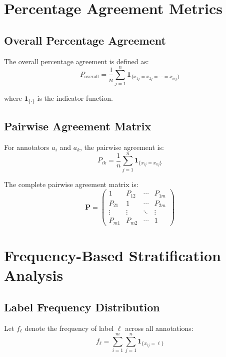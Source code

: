 \documentclass[11pt]{article}
\begin{document}
\section{Percentage Agreement Metrics}

\subsection{Overall Percentage Agreement}

The overall percentage agreement is defined as:
\begin{equation}
P_{\text{overall}} = \frac{1}{n} \sum_{j=1}^{n} \mathbf{1}_{\{x_{1j} = x_{2j} = \cdots = x_{mj}\}}
\end{equation}

where $\mathbf{1}_{\{\cdot\}}$ is the indicator function.

\subsection{Pairwise Agreement Matrix}

For annotators $a_i$ and $a_k$, the pairwise agreement is:
\begin{equation}
P_{ik} = \frac{1}{n} \sum_{j=1}^{n} \mathbf{1}_{\{x_{ij} = x_{kj}\}}
\end{equation}

The complete pairwise agreement matrix is:
\begin{equation}
\mathbf{P} = \begin{pmatrix}
1 & P_{12} & \cdots & P_{1m} \\
P_{21} & 1 & \cdots & P_{2m} \\
\vdots & \vdots & \ddots & \vdots \\
P_{m1} & P_{m2} & \cdots & 1
\end{pmatrix}
\end{equation}

\section{Frequency-Based Stratification Analysis}

\subsection{Label Frequency Distribution}

Let $f_\ell$ denote the frequency of label $\ell$ across all annotations:
\begin{equation}
f_\ell = \sum_{i=1}^{m} \sum_{j=1}^{n} \mathbf{1}_{\{x_{ij} = \ell\}}
\end{equation}
\end{document}
